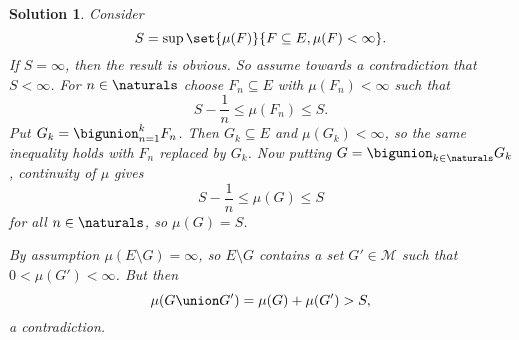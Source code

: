 \documentclass[article, a4paper, 11pt, oneside]{memoir}
\numberwithin{equation}{chapter}
\newcommand{\calM}{\mathcal{M}}
\theoremstyle{nonumberplain}
\newtheorem{solution}{Solution}
\begin{document}
\begin{solution}
	Consider
	\begin{equation*}
		S = \sup \set{ \mu(F) }{ F \subseteq E, \mu(F) < \infty }.
	\end{equation*}
	If $S = \infty$, then the result is obvious. So assume towards a contradiction that $S < \infty$. For $n \in \naturals$ choose $F_n \subseteq E$ with $\mu(F_n) < \infty$ such that
	\begin{equation*}
		S - \frac{1}{n} \leq \mu(F_n) \leq S.
	\end{equation*}
	Put $G_k = \bigunion_{n=1}^k F_n$. Then $G_k \subseteq E$ and $\mu(G_k) < \infty$, so the same inequality holds with $F_n$ replaced by $G_k$. Now putting $G = \bigunion_{k \in \naturals} G_k$, continuity of $\mu$ gives
	\begin{equation*}
		S - \frac{1}{n} \leq \mu(G) \leq S
	\end{equation*}
	for all $n \in \naturals$, so $\mu(G) = S$.
	
	By assumption $\mu(E \setminus G) = \infty$, so $E \setminus G$ contains a set $G' \in \calM$ such that $0 < \mu(G') < \infty$. But then
	\begin{equation*}
		\mu(G \union G') = \mu(G) + \mu(G') > S,
	\end{equation*}
	a contradiction.
\end{solution}
\end{document}
